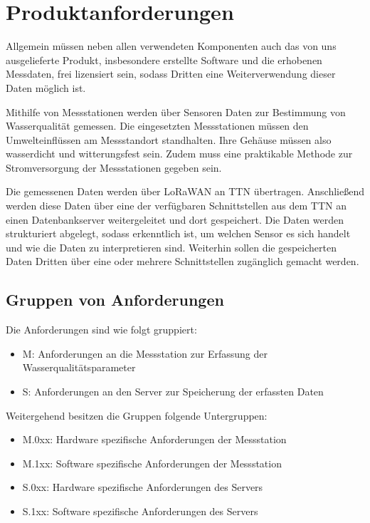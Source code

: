 \section{Produktanforderungen}

Allgemein müssen neben allen verwendeten Komponenten auch das von uns ausgelieferte
Produkt, insbesondere erstellte Software und die erhobenen Messdaten, frei lizensiert
sein, sodass Dritten eine Weiterverwendung dieser Daten möglich ist.

Mithilfe von Messstationen werden über Sensoren Daten zur Bestimmung von Wasserqualität
gemessen. Die eingesetzten Messstationen müssen den Umwelteinflüssen am Messstandort
standhalten. Ihre Gehäuse müssen also wasserdicht und witterungsfest sein. Zudem muss
eine praktikable Methode zur Stromversorgung der Messstationen gegeben sein.

Die gemessenen Daten werden über LoRaWAN an TTN übertragen. Anschließend werden diese
Daten über eine der verfügbaren Schnittstellen aus dem TTN an einen Datenbankserver
weitergeleitet und dort gespeichert. Die Daten werden strukturiert abgelegt,
sodass erkenntlich ist, um welchen Sensor es sich handelt und wie die Daten zu
interpretieren sind. Weiterhin sollen die gespeicherten Daten Dritten über
eine oder mehrere Schnittstellen zugänglich gemacht werden.

\subsection{Gruppen von Anforderungen}

Die Anforderungen sind wie folgt gruppiert:
\begin{itemize}
	\item M: Anforderungen an die Messstation zur Erfassung der Wasserqualitätsparameter
	\item S: Anforderungen an den Server zur Speicherung der erfassten Daten
\end{itemize}

Weitergehend besitzen die Gruppen folgende Untergruppen:
\begin{itemize}
	\item M.0xx: Hardware spezifische Anforderungen der Messstation
	\item M.1xx: Software spezifische Anforderungen der Messstation
	\item S.0xx: Hardware spezifische Anforderungen des Servers
	\item S.1xx: Software spezifische Anforderungen des Servers
\end{itemize}

